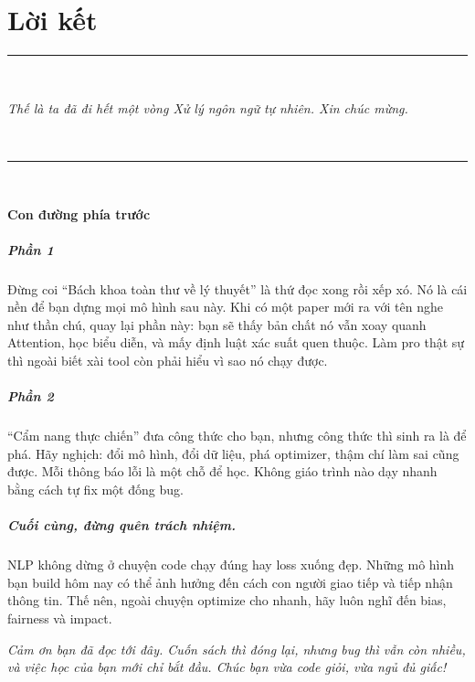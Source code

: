 \chapter*{Lời kết}

\begin{center}
    \vspace*{4cm}
    \rule{0.8\textwidth}{0.4pt} \\[0.8cm]
    \parbox{0.9\textwidth}{
        \centering
        \textit{
        Thế là ta đã đi hết một vòng Xử lý ngôn ngữ tự nhiên. Xin chúc mừng.
        }
    } \\[1cm]

    \rule{0.8\textwidth}{0.4pt} \\[2cm]
\end{center}

\noindent
\textbf{Con đường phía trước}

\paragraph{Phần 1}  
Đừng coi “Bách khoa toàn thư về lý thuyết” là thứ đọc xong rồi xếp xó. Nó là cái nền để bạn dựng mọi mô hình sau này. 
Khi có một paper mới ra với tên nghe như thần chú, quay lại phần này: bạn sẽ thấy bản chất nó vẫn xoay quanh Attention, 
học biểu diễn, và mấy định luật xác suất quen thuộc. Làm pro thật sự thì ngoài biết xài tool còn phải hiểu vì sao nó chạy được.  

\paragraph{Phần 2}  
“Cẩm nang thực chiến” đưa công thức cho bạn, nhưng công thức thì sinh ra là để phá. 
Hãy nghịch: đổi mô hình, đổi dữ liệu, phá optimizer, thậm chí làm sai cũng được.  
Mỗi thông báo lỗi là một chỗ để học. Không giáo trình nào dạy nhanh bằng cách tự fix một đống bug.

\paragraph{Cuối cùng, đừng quên trách nhiệm.}  
NLP không dừng ở chuyện code chạy đúng hay loss xuống đẹp. Những mô hình bạn build hôm nay có thể ảnh hưởng đến cách con người giao tiếp và tiếp nhận thông tin.
Thế nên, ngoài chuyện optimize cho nhanh, hãy luôn nghĩ đến bias, fairness và impact.

\vfill

\begin{center}
    \parbox{0.9\textwidth}{
        \centering
        {\itshape
        Cảm ơn bạn đã đọc tới đây.  
        Cuốn sách thì đóng lại, nhưng bug thì vẫn còn nhiều, và việc học của bạn mới chỉ bắt đầu.  
        Chúc bạn vừa code giỏi, vừa ngủ đủ giấc!
        }
    }
\end{center}
